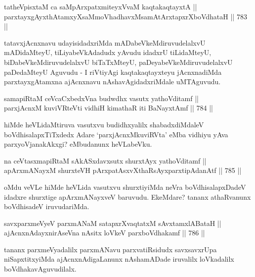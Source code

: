 \begin{shl}
tatheVpisxtaM ca saMpArxpatxmiteyxVvaM kaqtakaqtayxtA || \\
parxtayxgAyxthAtamxyXsaMmoVhadhavxMsamAtArxtapxrXboVdhataH \hfill || 783 ||  
\end{shl}

\begin{artha} 
tatavxjAcnxnavu udayisidadxriMda mADabeVkeMdiruvudelalxvU mADidaMteyU, tiLiyabeVkAdadudx yAvudu idadxrU tiLidaMteyU, biDabeVkeMdiruvudelalxvU biTaTxMteyU, paDeyabeVkeMdiruvudelalxvU paDedaMteyU Aguvudu - I riVtiyAgi kaqtakaqtayxteyu jAcnxnadiMda parxtayxgAtamxna ajAcnxnavu nAshavAgidadxriMdale uMTAguvudu.
\end{artha}


\begin{shl}
samapiRtaM ceVcaCxbedxVna budwdhx vasutx yathoVditamf || \\
parxjAcnxM kuviVRteVti vidhiH kimathaR iti BaNayxtAmf \hfill || 784 ||  
\end{shl}

\begin{artha} 
hiMde heVLidaMtiruva vasutxvu budidhxyalilx shabadxdiMdaleV boVdhisalapxTiTxdedx Adare `parxjAcnxMkuviRVta' eMba vidhiyu yAva parxyoVjanakAkxgi? eMbudanunx heVLabeVku.
\end{artha}

\begin{shl}
na ceVtasxmapiRtaM sAkASxdavxsutx shurxtAyx yathoVditamf ||  \\
apArxmANayxM shurxteVH pArxpatAsxvXthaRsAyxparxtipAdanAtf \hfill || 785 ||  
\end{shl}

\begin{artha} 
oMdu veVLe hiMde heVLida vasutxvu shurxtiyiMda neVra boVdhisalapxDadeV idadxre shurxtige apArxmANayxveV baruvudu. EkeMdare? tananx athaRvanunx boVdhisadeV iruvudariMda.
\end{artha}


\begin{shl}
savxparxmeVyeV parxmANaM satapxrXvaqtatxM sAvxtamxlABataH || \\
ajAcnxnAdayxnirAseVna nAsitx loVkeV parxboVdhakamf \hfill || 786 ||  
\end{shl}

\begin{artha} 
tananx parxmeVyadalilx parxmANavu parxvatiRsidudx savxsavxrUpa niSapxtitxyiMda ajAcnxnAdigaLanunx nAshamADade iruvalilx loVkadalilx boVdhakavAguvudilalx.
\end{artha}

